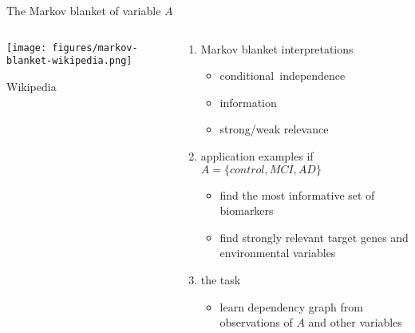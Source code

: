 \documentclass[aspectratio=169]{beamer}
\begin{document}
\begin{frame}{The Markov blanket of variable $A$}
\begin{columns}[t]
\begin{column}{0.5\textwidth}

\begin{center}
\texttt{[image: figures/markov-blanket-wikipedia.png]}
\end{center}

\begin{center}
\tiny{Wikipedia}
\end{center}
\end{column}

\begin{column}{0.5\textwidth}
\begin{enumerate}
  \item<1> Markov blanket interpretations
  \begin{itemize}
    \item conditional~independence
    \item information
    \item strong/weak relevance
  \end{itemize}
  \item<2> application examples if \(A = \{ control, MCI, AD \} \)
  \begin{itemize}
    \item find the most informative set of biomarkers
    \item find strongly relevant target genes and environmental variables
  \end{itemize}
  \item<3> the task
  \begin{itemize}
    \item learn dependency graph from observations of $A$ and other
    variables
  \end{itemize}
\end{enumerate}

\end{column}
\end{columns}
\end{frame}
\end{document}
